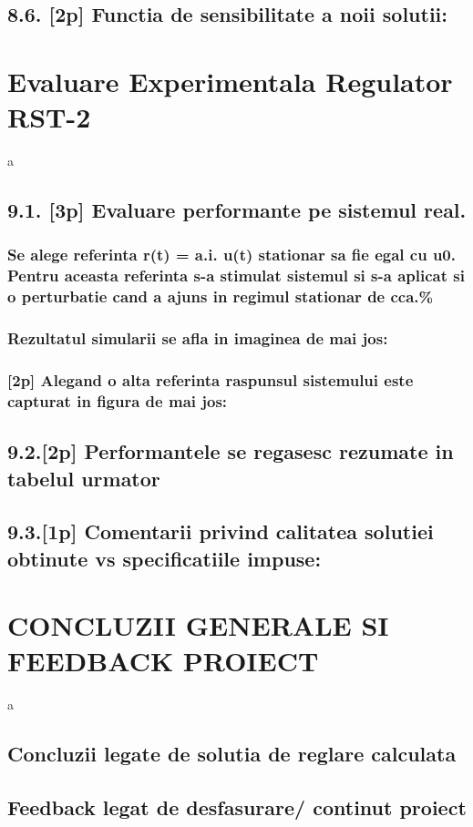 \documentclass[12pt,english]{article}
\begin{document}
\subsection {8.6. [2p] Functia de sensibilitate a noii solutii: }

\section {Evaluare Experimentala Regulator RST-2 }
a
\subsection {9.1. [3p] Evaluare performante pe sistemul real. }
\subsubsection {Se alege referinta r(t) = a.i. u(t) stationar sa fie egal cu u0. Pentru aceasta referinta s-a stimulat sistemul si s-a aplicat si o perturbatie cand a ajuns in regimul stationar de cca.\% }
\subsubsection {Rezultatul simularii se afla in imaginea de mai jos: }
\subsubsection {[2p] Alegand o alta referinta raspunsul sistemului este capturat in figura de mai jos: }
\subsection {9.2.[2p] Performantele se regasesc rezumate in tabelul urmator }
\subsection {9.3.[1p] Comentarii privind calitatea solutiei obtinute vs specificatiile impuse: }

\section {CONCLUZII GENERALE SI FEEDBACK PROIECT }
a
\subsection {Concluzii legate de solutia de reglare calculata }
\subsection {Feedback legat de desfasurare/ continut proiect }
\end{document}
